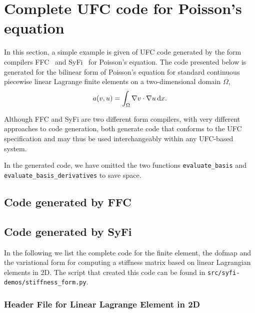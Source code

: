 \chapter{Complete UFC code for Poisson's equation}

In this section, a simple example is given of UFC code generated by
the form compilers
FFC~\cite{www:ffc,logg:article:07,logg:article:09,logg:article:10,logg:article:11}
and SyFi~\cite{www:syfi} for Poisson's equation. The code presented
below is generated for the bilinear form of Poisson's equation for
standard continuous piecewise linear Lagrange finite elements on a
two-dimensional domain $\Omega$,
\begin{equation}
  a(v, u) = \int_{\Omega} \nabla v \cdot \nabla u \, \mathrm{d}x.
\end{equation}

Although FFC and SyFi are two different form compilers, with very
different approaches to code generation, both generate code that
conforms to the UFC specification and may thus be used interchangeably
within any UFC-based system.

In the generated code, we have omitted the two functions
\texttt{evaluate\_basis} and
\texttt{evaluate\_basis\_derivatives}\footnotemark{} to save space.


\section{Code generated by FFC}

\scriptsize
{}
\normalsize

\section{Code generated by SyFi}

In the following we list the complete code for the finite element, 
the dofmap and the variational form for computing a stiffness matrix
based on linear Lagrangian elements in 2D. 
The script that created this code can be found in \texttt{src/syfi-demos/stiffness\_form.py}. 


\subsection{Header File for Linear Lagrange Element in 2D}

